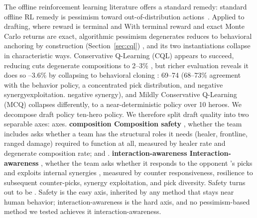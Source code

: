 \documentclass[journal]{IEEEtran}
\providecommand{\DIFaddtex}[1]{{\protect\color{blue} \sf #1}} %
\providecommand{\DIFdeltex}[1]{{\protect\color{red} \scriptsize #1}} %
\providecommand{\DIFaddbegin}{} %
\providecommand{\DIFaddend}{} %
\providecommand{\DIFdelbegin}{} %
\providecommand{\DIFdelend}{} %
\providecommand{\DIFadd}[1]{\texorpdfstring{\DIFaddtex{#1}}{#1}} %
\providecommand{\DIFdel}[1]{\texorpdfstring{\DIFdeltex{#1}}{}} %
\begin{document}
The \DIFdelbegin \DIFdel{offline reinforcement learning literature offers a standard remedy: }\DIFdelend \DIFaddbegin \DIFadd{standard offline RL remedy is }\DIFaddend pessimism toward out-of-distribution actions~\cite{kumar2020conservative,lyu2022mildly}. \DIFdelbegin \DIFdel{Applied to drafting, where reward is terminal and }\DIFdelend \DIFaddbegin \DIFadd{With terminal reward and exact }\DIFaddend Monte Carlo returns\DIFdelbegin \DIFdel{are exact}\DIFdelend , algorithmic pessimism \DIFdelbegin \DIFdel{degenerates }\DIFdelend \DIFaddbegin \DIFadd{reduces }\DIFaddend to behavioral anchoring \DIFdelbegin \DIFdel{by construction }\DIFdelend (Section~\ref{sec:cql})\DIFdelbegin \DIFdel{, and its two instantiations collapse in characteristic ways}\DIFdelend . Conservative Q-Learning (CQL) \DIFdelbegin \DIFdel{appears to succeed, reducing }\DIFdelend \DIFaddbegin \DIFadd{cuts }\DIFaddend degenerate compositions to \DIFdelbegin \DIFdel{2--3\% , but richer evaluation reveals it does so }\DIFdelend \DIFaddbegin \DIFadd{1.5--3.6\% }\DIFaddend by collapsing to behavioral cloning \DIFdelbegin \DIFdel{: 69--74}\DIFdelend \DIFaddbegin \DIFadd{(68--73}\DIFaddend \% agreement with the behavior policy, \DIFdelbegin \DIFdel{a concentrated pick distribution, and negative synergyexploitation. }\DIFdelend \DIFaddbegin \DIFadd{negative synergy), and }\DIFaddend Mildly Conservative Q-Learning (MCQ) collapses \DIFdelbegin \DIFdel{differently, }\DIFdelend to a near-deterministic \DIFdelbegin \DIFdel{policy over 10 heroes. We decompose draft policy }\DIFdelend \DIFaddbegin \DIFadd{ten-hero policy. We therefore split draft }\DIFaddend quality into two \DIFdelbegin \DIFdel{separable axes: }\DIFdelend \DIFaddbegin \DIFadd{axes. }\DIFaddend \textbf{\DIFdelbegin \DIFdel{composition }\DIFdelend \DIFaddbegin \DIFadd{Composition }\DIFaddend safety} \DIFdelbegin \DIFdel{, whether the team includes }\DIFdelend \DIFaddbegin \DIFadd{asks whether a team has }\DIFaddend the structural roles \DIFaddbegin \DIFadd{it needs }\DIFaddend (healer, frontline, ranged damage)\DIFdelbegin \DIFdel{required to function at all, measured by healer rate and degenerate composition rate; and }\DIFdelend \DIFaddbegin \DIFadd{. }\DIFaddend \textbf{\DIFdelbegin \DIFdel{interaction-awareness}\DIFdelend \DIFaddbegin \DIFadd{Interaction-awareness}\DIFaddend } \DIFdelbegin \DIFdel{, whether the team }\DIFdelend \DIFaddbegin \DIFadd{asks whether it }\DIFaddend responds to the opponent \DIFdelbegin \DIFdel{'s picks }\DIFdelend and exploits internal synergies\DIFdelbegin \DIFdel{, measured by counter responsiveness, resilience to subsequent counter-picks, synergy exploitation, and pick diversity. Safety turns out to be }\DIFdelend \DIFaddbegin \DIFadd{. Safety is }\DIFaddend the easy axis, inherited by any method that stays near human behavior; \DIFdelbegin \DIFdel{interaction-awareness is the hard axis, and }\DIFdelend no pessimism-based method we tested achieves \DIFdelbegin \DIFdel{it}\DIFdelend \DIFaddbegin \DIFadd{interaction-awareness}\DIFaddend .
\end{document}
